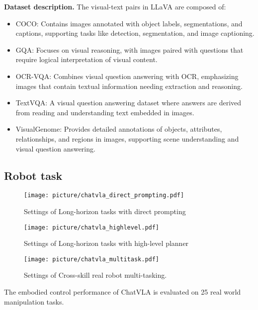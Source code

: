 \textbf{Dataset description.}\label{sec:llava_dataset}
The visual-text pairs in LLaVA are composed of:
\begin{itemize}
    \item COCO: Contains images annotated with object labels, segmentations, and captions, supporting tasks like detection, segmentation, and image captioning.
    \item GQA: Focuses on visual reasoning, with images paired with questions that require logical interpretation of visual content.
    \item OCR-VQA: Combines visual question answering with OCR, emphasizing images that contain textual information needing extraction and reasoning.
    \item TextVQA: A visual question answering dataset where answers are derived from reading and understanding text embedded in images.
    \item VisualGenome: Provides detailed annotations of objects, attributes, relationships, and regions in images, supporting scene understanding and visual question answering.
\end{itemize}

\subsection{Robot task}

\begin{figure}[t]
   \centering
   \texttt{[image: picture/chatvla\_direct\_prompting.pdf]}
   \caption{Settings of Long-horizon tasks with direct prompting}
   \label{fig:realpic_direct}
\end{figure}

\begin{figure*}[t]
   \centering
   \texttt{[image: picture/chatvla\_highlevel.pdf]}
   \caption{Settings of Long-horizon tasks with high-level planner}
   \label{fig:realpic_highlevel}
\end{figure*}


\begin{figure*}[t]
   \centering
   \texttt{[image: picture/chatvla\_multitask.pdf]}
   \caption{Settings of Cross-skill real robot multi-tasking.}
   \label{fig:realpic_other}
\end{figure*}


The embodied control performance of ChatVLA is evaluated on 25 real world manipulation tasks.

